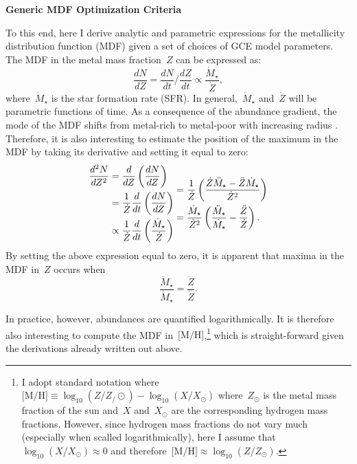 \documentclass[12pt]{article}
\newcommand{\mh}{\ensuremath{\text{[M/H]}}}
\begin{document}
\par\null\par\noindent
{\large \textbf{Generic MDF Optimization Criteria}}
\par\noindent
To this end, here I derive analytic and parametric expressions for the
metallicity distribution function (MDF) given a set of choices of GCE model
parameters.
The MDF in the metal mass fraction~$Z$ can be expressed as:
\begin{equation}
\frac{dN}{dZ} = \frac{dN}{dt} \bigg/ \frac{dZ}{dt}
\propto \frac{\dot{M}_\star}{\dot{Z}},
\label{eq:dndz}
\end{equation}
where~$\dot{M}_\star$ is the star formation rate (SFR).
In general,~$\dot{M}_\star$ and~$\dot{Z}$ will be parametric functions of time.
As a consequence of the abundance gradient, the mode of the MDF shifts from
metal-rich to metal-poor with increasing radius
\citep[see, e.g.,][]{Hayden2015}.
Therefore, it is also interesting to estimate the position of the maximum in
the MDF by taking its derivative and setting it equal to zero:
\begin{subequations}\begin{align}
\frac{d^2N}{dZ^2} &= \frac{d}{dZ} \left(\frac{dN}{dZ}\right)
\\
&= \frac{1}{\dot{Z}} \frac{d}{dt} \left(\frac{dN}{dZ}\right)
\\
&\propto \frac{1}{\dot{Z}} \frac{d}{dt}
\left(\frac{\dot{M}_\star}{\dot{Z}}\right)
\end{align}
\\
\begin{align}
&= \frac{1}{\dot{Z}} \left(\frac{
	\dot{Z}\ddot{M}_\star - \ddot{Z}\dot{M}_\star
}{
	\dot{Z}^2
}\right)
\\
&= \frac{\dot{M}_\star}{\dot{Z}^2}
\left(\frac{\ddot{M}_\star}{\dot{M}_\star} - \frac{\ddot{Z}}{\dot{Z}}\right).
\label{eq:d2ndz2}
\end{align}\end{subequations}
By setting the above expression equal to zero, it is apparent that maxima in the
MDF in~$Z$ occurs when
\begin{equation}
\frac{\ddot{M}_\star}{\dot{M}_\star} = \frac{\ddot{Z}}{\dot{Z}}.
\label{eq:zmdf_maxima_criterion}
\end{equation}
\par
In practice, however, abundances are quantified logarithmically.
It is therefore also interesting to compute the MDF in~\mh,\footnote{
	I adopt standard notation where~$\mh \equiv \log_{10}(Z / Z_/\odot) -
	\log_{10}(X / X_\odot)$ where~$Z_\odot$ is the metal mass fraction of the
	sun and~$X$ and~$X_\odot$ are the corresponding hydrogen mass fractions.
	However, since hydrogen mass fractions do not vary much (especially when
	scalled logarithmically), here I assume that~$\log_{10}(X / X_\odot)
	\approx 0$ and therefore~$\mh \approx \log_{10}(Z / Z_\odot)$.
} which is straight-forward given the derivations already written out above.
\end{document}
